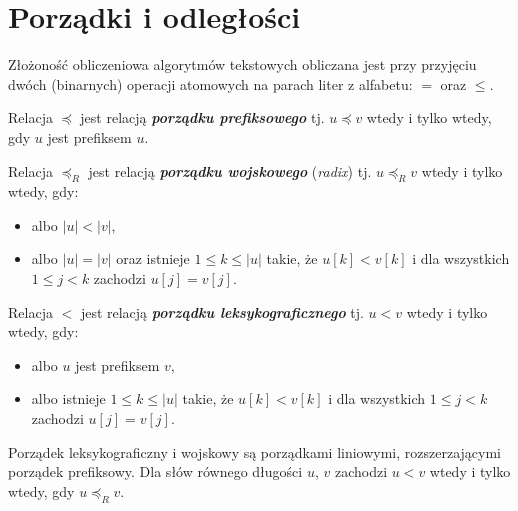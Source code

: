 \section{Porządki i odległości}

Złożoność obliczeniowa algorytmów tekstowych obliczana jest przy przyjęciu dwóch (binarnych) operacji atomowych na parach liter z alfabetu: $=$ oraz $\le$.

\begin{definition}{}{}
  Relacja $\preceq$ jest relacją \textbf{\textit{porządku prefiksowego}} tj. $u \preceq v$ wtedy i tylko wtedy, gdy $u$ jest prefiksem $u$.
\end{definition}

\begin{definition}{}{}
  Relacja $\preceq_R$ jest relacją \textbf{\textit{porządku wojskowego}} (\emph{radix}) tj. $u \preceq_R v$ wtedy i tylko wtedy, gdy:
  \begin{itemize}
    \item albo $|u| < |v|$,
    \item albo $|u| = |v|$ oraz istnieje $1 \le k \le |u|$ takie, że $u[k] < v[k]$ i dla wszystkich $1 \le j < k$ zachodzi $u[j] = v[j]$.
  \end{itemize}
\end{definition}

\begin{definition}{}{}
  Relacja $<$ jest relacją \textbf{\textit{porządku leksykograficznego}} tj. $u < v$ wtedy i tylko wtedy, gdy:
  \begin{itemize}
    \item albo $u$ jest prefiksem $v$,
    \item albo istnieje $1 \le k \le |u|$ takie, że $u[k] < v[k]$ i dla wszystkich $1 \le j < k$ zachodzi $u[j] = v[j]$.
  \end{itemize}
\end{definition}

\begin{corollary}{}{}
  Porządek leksykograficzny i wojskowy są porządkami liniowymi, rozszerzającymi porządek prefiksowy. Dla słów równego długości $u$, $v$ zachodzi $u < v$ wtedy i tylko wtedy, gdy $u \preceq_R v$.
\end{corollary}